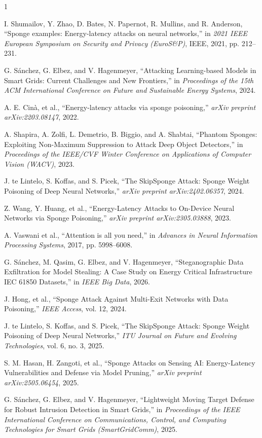 \documentclass[conference]{IEEEtran}
\begin{document}
\begin{thebibliography}{1}

I. Shumailov, Y. Zhao, D. Bates, N. Papernot, R. Mullins, and R. Anderson, ``Sponge examples: Energy-latency attacks on neural networks,'' in \emph{2021 IEEE European Symposium on Security and Privacy (EuroS\&P)}, IEEE, 2021, pp. 212--231.

G. Sánchez, G. Elbez, and V. Hagenmeyer, ``Attacking Learning-based Models in Smart Grids: Current Challenges and New Frontiers,'' in \emph{Proceedings of the 15th ACM International Conference on Future and Sustainable Energy Systems}, 2024.

A. E. Cinà, et al., ``Energy-latency attacks via sponge poisoning,'' \emph{arXiv preprint arXiv:2203.08147}, 2022.

A. Shapira, A. Zolfi, L. Demetrio, B. Biggio, and A. Shabtai, ``Phantom Sponges: Exploiting Non-Maximum Suppression to Attack Deep Object Detectors,'' in \emph{Proceedings of the IEEE/CVF Winter Conference on Applications of Computer Vision (WACV)}, 2023.

J. te Lintelo, S. Koffas, and S. Picek, ``The SkipSponge Attack: Sponge Weight Poisoning of Deep Neural Networks,'' \emph{arXiv preprint arXiv:2402.06357}, 2024.

Z. Wang, Y. Huang, et al., ``Energy-Latency Attacks to On-Device Neural Networks via Sponge Poisoning,'' \emph{arXiv preprint arXiv:2305.03888}, 2023.

A. Vaswani et al., ``Attention is all you need,'' in \emph{Advances in Neural Information Processing Systems}, 2017, pp. 5998--6008.

G. Sánchez, M. Qasim, G. Elbez, and V. Hagenmeyer, ``Steganographic Data Exfiltration for Model Stealing: A Case Study on Energy Critical Infrastructure IEC 61850 Datasets,'' in \emph{IEEE Big Data}, 2026.

J. Hong, et al., ``Sponge Attack Against Multi-Exit Networks with Data Poisoning,'' \emph{IEEE Access}, vol. 12, 2024.

J. te Lintelo, S. Koffas, and S. Picek, ``The SkipSponge Attack: Sponge Weight Poisoning of Deep Neural Networks,'' \emph{ITU Journal on Future and Evolving Technologies}, vol. 6, no. 3, 2025.

S. M. Hasan, H. Zangoti, et al., ``Sponge Attacks on Sensing AI: Energy-Latency Vulnerabilities and Defense via Model Pruning,'' \emph{arXiv preprint arXiv:2505.06454}, 2025.

G. Sánchez, G. Elbez, and V. Hagenmeyer, ``Lightweight Moving Target Defense for Robust Intrusion Detection in Smart Grids,'' in \emph{Proceedings of the IEEE International Conference on Communications, Control, and Computing Technologies for Smart Grids (SmartGridComm)}, 2025.

\end{thebibliography}
\end{document}
